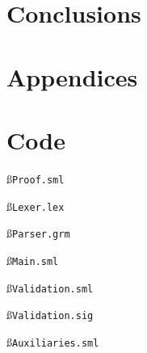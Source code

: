 \documentclass[a4paper]{article}
\begin{document}
\section{Conclusions}


\label{LastBody}
\pagebreak
{}


\label{LastBio}
\clearpage
\appendix
\section*{Appendices}\label{FirstApp}
\renewcommand \thesubsection{\alph{subsection}}
\section{Code}\label{code}
\ss{\tt{Proof.sml}}\label{Proof}

\ss{\tt{Lexer.lex}}\label{Lexer}

\ss{\tt{Parser.grm}}\label{Parser}

\ss{\tt{Main.sml}}\label{Main}

\ss{\tt{Validation.sml}}\label{Validation.sml}

\ss{\tt{Validation.sig}}\label{Validation.sig}

\ss{\tt{Auxiliaries.sml}}\label{Auxiliaries}

\label{LastApp}
\label{LastPage}
\end{document}
